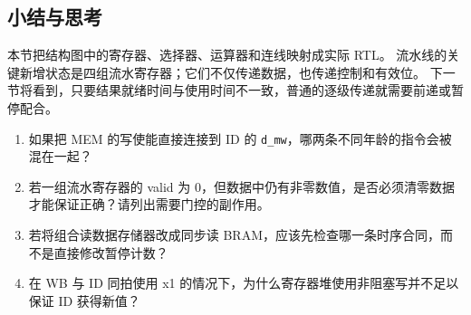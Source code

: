 
\subsection{小结与思考}

本节把结构图中的寄存器、选择器、运算器和连线映射成实际 RTL。
流水线的关键新增状态是四组流水寄存器；它们不仅传递数据，也传递控制和有效位。
下一节将看到，只要结果就绪时间与使用时间不一致，普通的逐级传递就需要前递或暂停配合。

\begin{enumerate}
\item 如果把 MEM 的写使能直接连接到 ID 的 \texttt{d\_mw}，哪两条不同年龄的指令会被混在一起？
\item 若一组流水寄存器的 valid 为 0，但数据中仍有非零数值，是否必须清零数据才能保证正确？请列出需要门控的副作用。
\item 若将组合读数据存储器改成同步读 BRAM，应该先检查哪一条时序合同，而不是直接修改暂停计数？
\item 在 WB 与 ID 同拍使用 x1 的情况下，为什么寄存器堆使用非阻塞写并不足以保证 ID 获得新值？
\end{enumerate}
